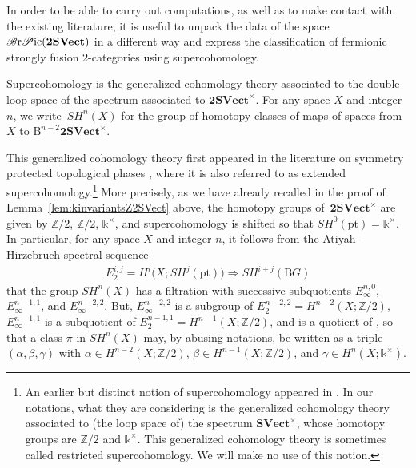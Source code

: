 \documentclass[10pt,a4paper]{amsart}
\numberwithin{equation}{section}
\begin{document}
In order to be able to carry out computations, as well as to make contact with the existing literature, it is useful to unpack the data of the space $\mathscr{B}{\rm r}\mathscr{P}{\rm ic}(\mathbf{2SVect})$ in a different way and express the classification of fermionic strongly fusion 2-categories using supercohomology.

\begin{Definition}
Supercohomology is the generalized cohomology theory associated to the double loop space of the spectrum associated to $\mathbf{2SVect}^{\times}$. For any space $X$ and integer $n$, we write~$SH^n(X)$ for the group of homotopy classes of maps of spaces from $X$ to $\mathrm{B}^{n-2}\mathbf{2SVect}^{\times}$.
\end{Definition}

This generalized cohomology theory first appeared in the literature on symmetry protected topological phases \cite{GJF0, KT,WG}, where it is also referred to as extended supercohomology.\footnote{An earlier but distinct notion of supercohomology appeared in \cite{GW}. In our notations, what they are considering is the generalized cohomology theory associated to (the loop space of) the spectrum $\mathbf{SVect}^{\times}$, whose homotopy groups are $\mathbb{Z}/2$ and $\mathds{k}^{\times}$. This generalized cohomology theory is sometimes called restricted supercohomology. We will make no use of this notion.} More precisely, as we have already recalled in the proof of Lemma~\ref{lem:kinvariantsZ2SVect} above, the homotopy groups of~$\mathbf{2SVect}^{\times}$ are given by $\mathbb{Z}/2$, $\mathbb{Z}/2$, $\mathds{k}^{\times}$, and supercohomology is shifted so that $SH^0(\mathrm{pt})=\mathds{k}^{\times}$. In particular, for any space $X$ and integer $n$, it follows from the Atiyah--Hirzebruch spectral sequence
\begin{gather*}
E_2^{i,j}=H^i\big(X;SH^j(\mathrm{pt})\big)\Rightarrow SH^{i+j}(\mathrm{B}G)
\end{gather*}
 that the group $SH^n(X)$ has a filtration with successive subquotients $E^{n,0}_{\infty}$, $E^{n-1,1}_{\infty}$, and $E^{n-2,2}_{\infty}$. But, $E^{n-2,2}_{\infty}$ is a subgroup of $E^{n-2,2}_{2}=H^{n-2}(X;\mathbb{Z}/2)$, $E^{n-1,1}_{\infty}$ is a subquotient of $E^{n-1,1}_{2}=H^{n-1}(X;\mathbb{Z}/2)$, and  is a quotient of , so that a class $\pi$ in $SH^n(X)$ may, by abusing notations, be written as a triple $(\alpha,\beta,\gamma)$ with $\alpha\in H^{n-2}(X;\mathbb{Z}/2)$, $\beta\in H^{n-1}(X;\mathbb{Z}/2)$, and $\gamma\in H^n(X;\mathds{k}^{\times})$.
\end{document}
